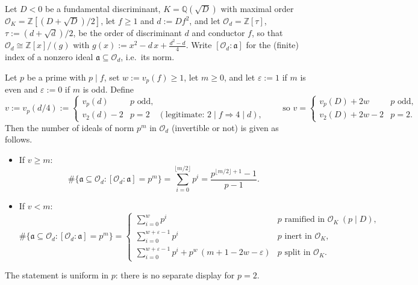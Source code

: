 
\begin{theorem}
\label{thm-3-1-2}
Let $D < 0$ be a fundamental discriminant, $K = \mathbb{Q}(\sqrt D)$ with maximal
order $\mathcal{O}_K = \mathbb{Z}[(D + \sqrt D)/2]$, let $f \geq 1$ and
$d := D f^2$, and let $\mathcal{O}_d = \mathbb{Z}[\tau]$, $\tau := (d + \sqrt d)/2$,
be the order of discriminant $d$ and conductor $f$, so that
$\mathcal{O}_d \cong \mathbb{Z}[x]/(g)$ with
$g(x) := x^2 - d\,x + \tfrac{d^2 - d}{4}$. Write
$[\mathcal{O}_d : \mathfrak a]$ for the (finite) index of a nonzero ideal
$\mathfrak a \subseteq \mathcal{O}_d$, i.e.\ its norm.

Let $p$ be a prime with $p \mid f$, set $w := v_p(f) \geq 1$, let $m \geq 0$, and
let $\varepsilon := 1$ if $m$ is even and $\varepsilon := 0$ if $m$ is odd. Define
\[
v := v_p(d/4) :=
\begin{cases}
v_p(d) & p \text{ odd},\\
v_2(d) - 2 & p = 2 \quad (\text{legitimate: } 2 \mid f \Rightarrow 4 \mid d),
\end{cases}
\qquad\text{so } v =
\begin{cases}
v_p(D) + 2w & p \text{ odd},\\
v_2(D) + 2w - 2 & p = 2.
\end{cases}
\]
Then the number of ideals of norm $p^m$ in $\mathcal{O}_d$ (invertible or not) is
given as follows.
\begin{itemize}
\item If $v \geq m$:
\[
\#\{\mathfrak a \subseteq \mathcal{O}_d : [\mathcal{O}_d : \mathfrak a] = p^m\}
= \sum_{i=0}^{\lfloor m/2 \rfloor} p^i
= \frac{p^{\lfloor m/2 \rfloor + 1} - 1}{p - 1}.
\]
\item If $v < m$:
\[
\#\{\mathfrak a \subseteq \mathcal{O}_d : [\mathcal{O}_d : \mathfrak a] = p^m\}
= \begin{cases}
\displaystyle\sum_{i=0}^{w} p^i
  & p \text{ ramified in } \mathcal{O}_K \ (p \mid D),\\[2ex]
\displaystyle\sum_{i=0}^{w + \varepsilon - 1} p^i
  & p \text{ inert in } \mathcal{O}_K,\\[2ex]
\displaystyle\sum_{i=0}^{w + \varepsilon - 1} p^i + p^w\,(m + 1 - 2w - \varepsilon)
  & p \text{ split in } \mathcal{O}_K.
\end{cases}
\]
\end{itemize}
The statement is uniform in $p$: there is no separate display for $p = 2$.
\end{theorem}


